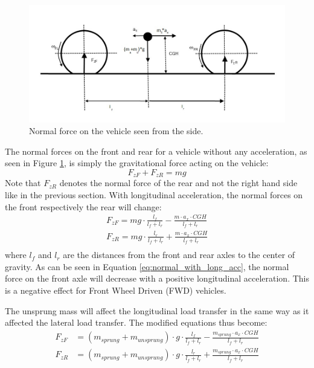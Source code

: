 \begin{figure}[h]
	\centering
	\includegraphics[width=1\textwidth]{Pictures/normal_force_longitudinal}
	\caption{Normal force on the vehicle seen from the side.}
	\label{normal_force_longitudinal}
\end{figure}
The normal forces on the front and rear for a vehicle without any acceleration, as seen in Figure \ref{normal_force_longitudinal}, is simply the gravitational force acting on the vehicle:
\begin{equation} \label{eq:normal_2}
	F_{zF} + F_{zR} = mg
\end{equation}
Note that $ F_{zR} $ denotes the normal force of the rear and not the right hand side like in the previous section. With longitudinal acceleration, the normal forces on the front respectively the rear will change:
\begin{equation} \label{eq:normal_with_long_acc}
\begin{split}
	F_{zF} = mg\cdot \frac{l_{f}}{l_{f}+l_{r}} - \frac{m\cdot a_{x}\cdot CGH}{l_{f}+l_{r}} \\
	F_{zR} = mg\cdot \frac{l_{r}}{l_{f}+l_{r}} + \frac{m\cdot a_{x}\cdot CGH}{l_{f}+l_{r}} \\	
\end{split}
\end{equation}
where $ l_{f} $ and $ l_{r} $ are the distances from the front and rear axles to the center of gravity. As can be seen in Equation \ref{eq:normal_with_long_acc}, the normal force on the front axle will decrease with a positive longitudinal acceleration. This is a negative effect for Front Wheel Driven (FWD) vehicles.

The unsprung mass will affect the longitudinal load transfer in the same way as it affected the lateral load transfer. The modified equations thus become: 
\begin{equation} \label{eq:normal_with_long_acc_unsprung}
\begin{split}
F_{zF} &= (m_{sprung}+m_{unsprung})\cdot g\cdot \frac{l_{f}}{l_{f}+l_{r}} - \frac{m_{sprung}\cdot a_{x}\cdot CGH}{l_{f}+l_{r}} \\
F_{zR} &= (m_{sprung}+m_{unsprung})\cdot g\cdot \frac{l_{r}}{l_{f}+l_{r}} + \frac{m_{sprung}\cdot a_{x}\cdot CGH}{l_{f}+l_{r}} \\	
\end{split}
\end{equation}

